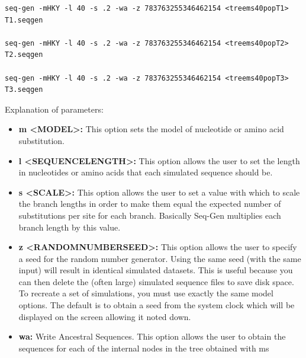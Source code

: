 \begin{itemize}
\begin{verbatim}
seq-gen -mHKY -l 40 -s .2 -wa -z 783763255346462154 <treems40popT1> T1.seqgen

seq-gen -mHKY -l 40 -s .2 -wa -z 783763255346462154 <treems40popT2> T2.seqgen

seq-gen -mHKY -l 40 -s .2 -wa -z 783763255346462154 <treems40popT3> T3.seqgen

\end{verbatim}

Explanation of parameters:

\begin{itemize}

\item\textbf{m <MODEL>:} This option sets the model of nucleotide or amino acid substitution.
\item\textbf{l <SEQUENCELENGTH>:} This option allows the user to set the length in nucleotides or amino acids that each simulated sequence should be.
\item\textbf{s <SCALE>:} This option allows the user to set a value with which to scale the branch lengths in order to make them equal the expected number of substitutions per site for each branch. Basically Seq-Gen multiplies each branch length by this value.
\item\textbf{z <RANDOMNUMBERSEED>:} This option allows the user to specify a seed for the random number generator. Using the same seed (with the same input) will result in identical simulated datasets. This is useful because you can then delete the (often large) simulated sequence files to save disk space. To recreate a set of simulations, you must use exactly the same model options. The default is to obtain a seed from the system clock which will be displayed on the screen allowing it noted down.
\item\textbf{wa:}
Write Ancestral Sequences. This option allows the user to obtain the sequences for each of the internal nodes in the tree obtained with ms 
\end{itemize}

\end{itemize}

